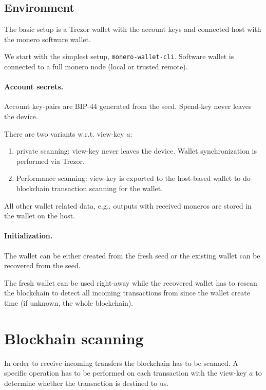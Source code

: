\documentclass[]{article}
\begin{document}
\subsection{Environment}

The basic setup is a Trezor wallet with the account keys and connected host with the monero software wallet.

We start with the simplest setup, \verb|monero-wallet-cli|. Software wallet is connected to a full monero node (local or trusted remote).

\paragraph{Account secrets.}
Account key-pairs are BIP-44 generated from the seed. Spend-key never leaves the device.

There are two variants w.r.t. view-key $a$:

\begin{enumerate}
	\item private scanning: view-key never leaves the device. Wallet synchronization is performed via Trezor. 
	\item Performance scanning: view-key is exported to the host-based wallet
	to do blockchain transaction scanning for the wallet.
\end{enumerate}

All other wallet related data, e.g., outputs with received moneros are
stored in the wallet on the host. 

\paragraph{Initialization.} The wallet can be either created from the fresh seed or the existing wallet can be recovered from the seed.

The fresh wallet can be used right-away while the recovered wallet has to rescan the blockchain to detect all incoming transactions from since the wallet create time (if unknown, the whole blockchain).

\section{Blockhain scanning}

In order to receive incoming transfers the blockchain has to be scanned. A specific operation has to be performed on each transaction with the view-key $a$ to determine whether the transaction is destined to us.
\end{document}
